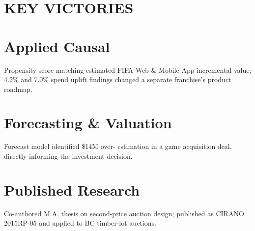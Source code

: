 \section{KEY VICTORIES}
\vspace{-0.25cm}
%
\section{\large \faGem Applied Causal}
Propensity score matching estimated FIFA Web \& Mobile App incremental value; 4.2\% and 7.0\% spend uplift findings changed a separate franchise's product roadmap.
%
\section{\large \faGem Forecasting \& Valuation}
Forecast model identified \$14M over- estimation in a game acquisition deal, directly informing the investment decision.
%
\section{\large \faGem Published Research}
Co-authored M.A. thesis on second-price auction design; published as CIRANO 2015RP-05 and applied to BC timber-lot auctions.
